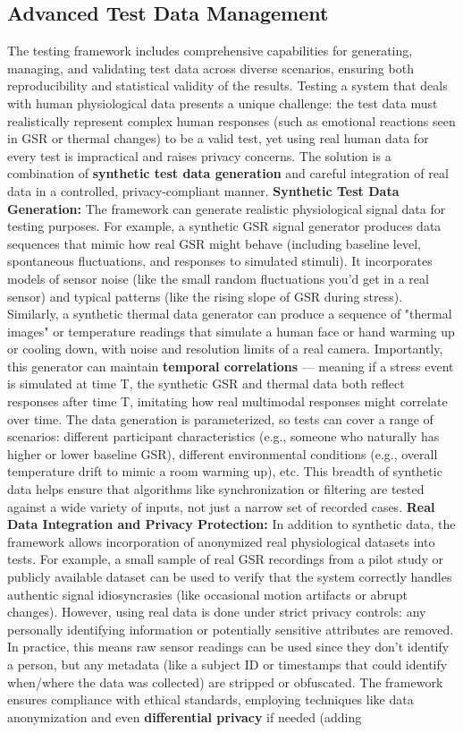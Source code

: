 \subsection{Advanced Test Data Management} The testing framework includes comprehensive capabilities for generating, managing, and validating test data across diverse scenarios, ensuring both reproducibility and statistical validity of the results. Testing a system that deals with human physiological data presents a unique challenge: the test data must realistically represent complex human responses (such as emotional reactions seen in GSR or thermal changes) to be a valid test, yet using real human data for every test is impractical and raises privacy concerns. The solution is a combination of \textbf{synthetic test data generation} and careful integration of real data in a controlled, privacy-compliant manner. \textbf{Synthetic Test Data Generation:} The framework can generate realistic physiological signal data for testing purposes. For example, a synthetic GSR signal generator produces data sequences that mimic how real GSR might behave (including baseline level, spontaneous fluctuations, and responses to simulated stimuli). It incorporates models of sensor noise (like the small random fluctuations you'd get in a real sensor) and typical patterns (like the rising slope of GSR during stress). Similarly, a synthetic thermal data generator can produce a sequence of "thermal images" or temperature readings that simulate a human face or hand warming up or cooling down, with noise and resolution limits of a real camera. Importantly, this generator can maintain \textbf{temporal correlations} --- meaning if a stress event is simulated at time T, the synthetic GSR and thermal data both reflect responses after time T, imitating how real multimodal responses might correlate over time. The data generation is parameterized, so tests can cover a range of scenarios: different participant characteristics (e.g., someone who naturally has higher or lower baseline GSR), different environmental conditions (e.g., overall temperature drift to mimic a room warming up), etc. This breadth of synthetic data helps ensure that algorithms like synchronization or filtering are tested against a wide variety of inputs, not just a narrow set of recorded cases. \textbf{Real Data Integration and Privacy Protection:} In addition to synthetic data, the framework allows incorporation of anonymized real physiological datasets into tests. For example, a small sample of real GSR recordings from a pilot study or publicly available dataset can be used to verify that the system correctly handles authentic signal idiosyncrasies (like occasional motion artifacts or abrupt changes). However, using real data is done under strict privacy controls: any personally identifying information or potentially sensitive attributes are removed. In practice, this means raw sensor readings can be used since they don't identify a person, but any metadata (like a subject ID or timestamps that could identify when/where the data was collected) are stripped or obfuscated. The framework ensures compliance with ethical standards, employing techniques like data anonymization and even \textbf{differential privacy} if needed (adding 